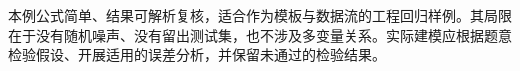 本例公式简单、结果可解析复核，适合作为模板与数据流的工程回归样例。其局限在于没有随机噪声、没有留出测试集，也不涉及多变量关系。实际建模应根据题意检验假设、开展适用的误差分析，并保留未通过的检验结果。
